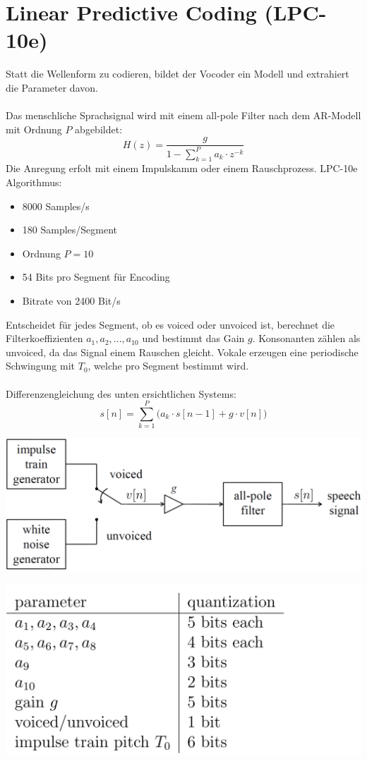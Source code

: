 \section{Linear Predictive Coding (LPC-10e)} 
Statt die Wellenform zu codieren, bildet der Vocoder ein Modell und
extrahiert die Parameter davon.\\\\
Das menschliche Sprachsignal wird mit einem all-pole Filter nach dem 
AR-Modell mit Ordnung $P$ abgebildet:
\[ H(z) = \frac{g}{1-\sum_{k=1}^{P}a_k\cdot z^{-k}} \]
Die Anregung erfolt mit einem Impulskamm oder einem Rauschprozess.
LPC-10e Algorithmus:
\begin{itemize}[noitemsep,topsep=3pt]
	\item 8000 Samples/s
	\item 180 Samples/Segment
	\item Ordnung $P=10$
	\item 54 Bits pro Segment für Encoding
	\item Bitrate von 2400 Bit/s
\end{itemize}
Entscheidet für jedes Segment, ob es voiced oder unvoiced ist, berechnet die
Filterkoeffizienten $a_1, a_2,...,a_{10}$ und bestimmt das Gain $g$. Konsonanten 
zählen als unvoiced, da das Signal einem Rauschen gleicht. Vokale erzeugen eine 
periodische Schwingung mit $T_0$, welche pro Segment bestimmt wird.\\
\\
Differenzengleichung des unten ersichtlichen Systems:
\[ s[n] = \sum_{k=1}^{P} \bigg(a_k\cdot s[n-1] + g \cdot v[n]\bigg) \]
\begin{minipage}{.5\textwidth}
\begin{center}
	\includegraphics[width=\textwidth]{../fig/speech_signal}
\end{center}
\end{minipage}
\begin{minipage}{.45\textwidth}
\begin{center}
	\includegraphics[width=\textwidth]{../fig/lpc_10e}
\end{center}
\end{minipage}
